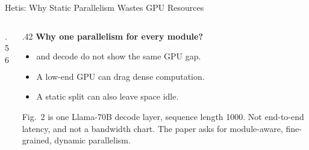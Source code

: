 
\begin{frame}[t,label=main_hetis_why]{Hetis: Why Static Parallelism Wastes GPU Resources}
\begin{columns}[T,onlytextwidth]
\begin{column}{.56\textwidth}
\end{column}
\begin{column}{.42\textwidth}
{\normalsize\textbf{Why one parallelism for every module?}}
\begin{itemize}\setlength{\itemsep}{.12cm}\footnotesize
\item {} and decode  do not show the same GPU gap.
\item A low-end GPU can drag dense computation.
\item A static split can also leave  space idle.
\end{itemize}
\vspace{.14cm}
{\footnotesize Fig.~2 is one Llama-70B decode layer, sequence length 1000. Not end-to-end latency, and not a bandwidth chart.}
\vspace{.12cm}
{\footnotesize The paper asks for module-aware, fine-grained, dynamic parallelism.}
\end{column}
\end{columns}
\vspace{.14cm}
\end{frame}

